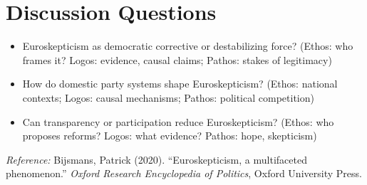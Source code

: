 \documentclass[11pt,a4paper]{article}
\begin{document}
\section*{Discussion Questions}

\begin{itemize}
\item Euroskepticism as democratic corrective or destabilizing force? (Ethos: who frames it? Logos: evidence, causal claims; Pathos: stakes of legitimacy)
\item How do domestic party systems shape Euroskepticism? (Ethos: national contexts; Logos: causal mechanisms; Pathos: political competition)
\item Can transparency or participation reduce Euroskepticism? (Ethos: who proposes reforms? Logos: what evidence? Pathos: hope, skepticism)
\end{itemize}

\vspace{1em}
\noindent\footnotesize\textit{Reference:} Bijsmans, Patrick (2020). ``Euroskepticism, a multifaceted phenomenon.'' \textit{Oxford Research Encyclopedia of Politics}, Oxford University Press.
\end{document}
